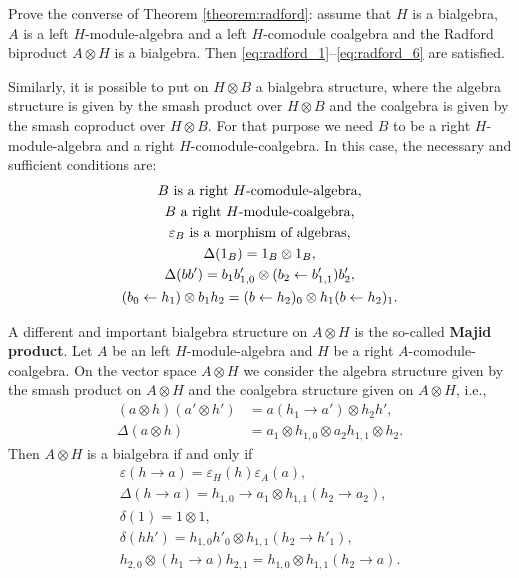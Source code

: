 \begin{exercise}
Prove the converse of Theorem \ref{theorem:radford}: assume that $H$ is a
bialgebra, $A$ is a left $H$-module-algebra and a left $H$-comodule coalgebra
and the Radford biproduct $A\otimes H$ is a bialgebra. Then
\eqref{eq:radford_1}--\eqref{eq:radford_6} are satisfied.
\end{exercise}


Similarly, it is possible to put on $H\otimes B$ a bialgebra structure, where
the algebra structure is given by the smash product over $H\otimes B$ and the
coalgebra is given by the smash coproduct over $H\otimes B$. For that purpose
we need $B$ to be a right $H$-module-algebra and a right
$H$-comodule-coalgebra. In this case, the necessary and sufficient conditions
are:
\begin{gather*}
B\text{ is a right \ensuremath{H}-comodule-algebra,}\\
B\text{ a right \ensuremath{H}-module-coalgebra,}\\
\varepsilon_{B}\text{ is a morphism of algebras,}\\
\Delta(1_{B})=1_{B}\otimes1_{B},\\
\Delta(bb')=b_{1}b'_{1,0}\otimes(b_{2}\leftarrow b'_{1,1})b'_{2},\\
(b_{0}\leftarrow h_{1})\otimes b_{1}h_{2}=(b\leftarrow h_{2})_{0}\otimes h_{1}(b\leftarrow h_{2})_{1}.
\end{gather*}

A different and important bialgebra structure on $A\otimes H$ is
the so-called \textbf{Majid product}. Let $A$ be an left $H$-module-algebra
and $H$ be a right $A$-comodule-coalgebra. On the vector space $A\otimes H$
we consider the algebra structure given by the smash product on $A\otimes H$ and the coalgebra
structure given on $A\otimes H$, i.e.,
\begin{align*}
(a\otimes h)(a'\otimes h') & =a(h_{1}\rightarrow a')\otimes h_{2}h',\\
\Delta(a\otimes h) & =a_{1}\otimes h_{1,0}\otimes a_{2}h_{1,1}\otimes h_{2}.\end{align*}
Then $A\otimes H$ is a bialgebra if and only if \begin{gather*}
\varepsilon(h\rightarrow a)=\varepsilon_{H}(h)\varepsilon_{A}(a),\\
\Delta(h\rightarrow a)=h_{1,0}\rightarrow a_{1}\otimes h_{1,1}(h_{2}\rightarrow a_{2}),\\
\delta(1)=1\otimes1,\\
\delta(hh')=h_{1,0}h'_{0}\otimes h_{1,1}(h_{2}\rightarrow h'_{1}),\\
h_{2,0}\otimes(h_{1}\rightarrow a)h_{2,1}=h_{1,0}\otimes h_{1,1}(h_{2}\rightarrow a).
\end{gather*}


